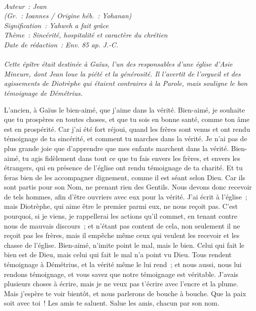\BFont
\noindent\hrulefill
{\footnotesize
\textit{
\bigskip
{\centering{}
\\Auteur~: Jean
\\(Gr.~: Ioannes / Origine héb.~: Yohanan)
\\Signification~: Yahweh a fait grâce
\\Thème~: Sincérité, hospitalité et caractère du chrétien
\\Date de rédaction~: Env. 85 ap. J.-C.\\}
}
\textit{
\\Cette épître était destinée à Gaïus, l'un des responsables d'une église d'Asie Mineure, dont Jean loue la piété et la générosité. Il l'avertit de l'orgueil et des agissements de Diotrèphe qui étaient contraires à la Parole, mais souligne le bon témoignage de Démétrius.\bigskip
}
}
\par\nobreak\noindent\hrulefill
\begin{multicols}{2}
\VerseOne{}L'ancien, à Gaïus le bien-aimé, que j'aime dans la vérité.
Bien-aimé, je souhaite que tu prospères en toutes choses, et que tu sois en bonne santé, comme ton âme est en prospérité.
Car j'ai été fort réjoui, quand les frères sont venus et ont rendu témoignage de ta sincérité, et comment tu marches dans la vérité.
Je n'ai pas de plus grande joie que d'apprendre que mes enfants marchent dans la vérité.
Bien-aimé, tu agis fidèlement dans tout ce que tu fais envers les frères, et envers les étrangers,
qui en présence de l'église ont rendu témoignage de ta charité. Et tu feras bien de les accompagner dignement, comme il est séant selon Dieu.
Car ils sont partis pour son Nom, ne prenant rien des Gentils.
Nous devons donc recevoir de tels hommes, afin d'être ouvriers avec eux pour la vérité.
J'ai écrit à l'église~; mais Diotrèphe, qui aime être le premier parmi eux, ne nous reçoit pas.
C'est pourquoi, si je viens, je rappellerai les actions qu'il commet, en tenant contre nous de mauvais discours~; et n'étant pas content de cela, non seulement il ne reçoit pas les frères, mais il empêche même ceux qui veulent les recevoir et les chasse de l'église.
Bien-aimé, n'imite point le mal, mais le bien. Celui qui fait le bien est de Dieu, mais celui qui fait le mal n'a point vu Dieu.
Tous rendent témoignage à Démétrius, et la vérité même le lui rend~; et nous aussi, nous lui rendons témoignage, et vous savez que notre témoignage est véritable.
J'avais plusieurs choses à écrire, mais je ne veux pas t'écrire avec l'encre et la plume.
Mais j'espère te voir bientôt, et nous parlerons de bouche à bouche.
Que la paix soit avec toi~! Les amis te saluent. Salue les amis, chacun par son nom.
\PPE{}
\end{multicols}
